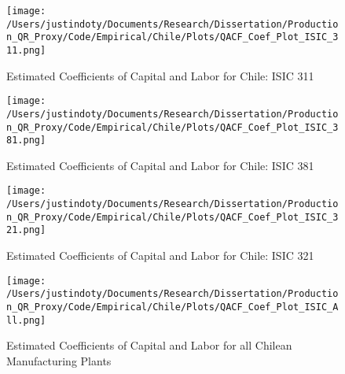 \documentclass[11pt]{article}
\begin{document}
\begin{figure}[H]
\centering
\caption{Estimated Coefficients of Capital and Labor for Chile: ISIC 311}
\texttt{[image: /Users/justindoty/Documents/Research/Dissertation/Production\_QR\_Proxy/Code/Empirical/Chile/Plots/QACF\_Coef\_Plot\_ISIC\_311.png]}
\label{fig:ACFCHL311}
\end{figure}

\begin{figure}[H]
\centering
\caption{Estimated Coefficients of Capital and Labor for Chile: ISIC 381}
\texttt{[image: /Users/justindoty/Documents/Research/Dissertation/Production\_QR\_Proxy/Code/Empirical/Chile/Plots/QACF\_Coef\_Plot\_ISIC\_381.png]}
\label{fig:ACFCHL381}
\end{figure}

\begin{figure}[H]
\centering
\caption{Estimated Coefficients of Capital and Labor for Chile: ISIC 321}
\texttt{[image: /Users/justindoty/Documents/Research/Dissertation/Production\_QR\_Proxy/Code/Empirical/Chile/Plots/QACF\_Coef\_Plot\_ISIC\_321.png]}
\label{fig:ACFCHL321}
\end{figure}

\begin{figure}[H]
\centering
\caption{Estimated Coefficients of Capital and Labor for all Chilean Manufacturing Plants}
\texttt{[image: /Users/justindoty/Documents/Research/Dissertation/Production\_QR\_Proxy/Code/Empirical/Chile/Plots/QACF\_Coef\_Plot\_ISIC\_All.png]}
\label{fig:ACFCHLall}
\end{figure}
\end{document}
